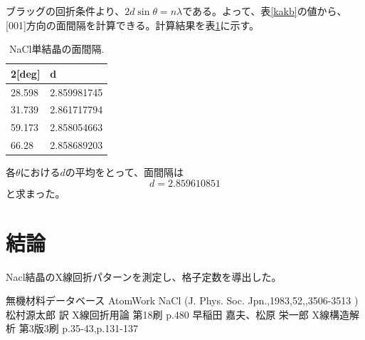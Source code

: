 \documentclass[11pt,a4j,uplatex]{jsarticle}
\begin{document}
\newpage

 ブラッグの回折条件より、$2d\sin\theta=n\lambda$である。よって、表\ref{kakb}の値から、[001]方向の面間隔を計算できる。計算結果を表\ref{d}に示す。%

 \begin{table}[htbp]
  \begin{center}
   \caption{NaCl単結晶の面間隔.}
   \begin{tabular}{|l|l|}  \hline
    2[deg] & d           \\  \hline  \hline
    28.598 & 2.859981745 \\
    31.739 & 2.861717794 \\
    59.173 & 2.858054663 \\
    66.28  & 2.858689203 \\ \hline
   \end{tabular}
   \label{d}
  \end{center}
 \end{table}

 各$\theta$における$d$の平均をとって、面間隔は
 \begin{equation}
  d=2.859610851
  \label{fin}
 \end{equation}
 と求まった。
\fi

\section{結論}
Nacl結晶のX線回折パターンを測定し、格子定数を導出した。

\begin{thebibliography}{9}
 無機材料データベース AtomWork  NaCl (J. Phys. Soc. Jpn.,1983,52,,3506-3513 )
  松村源太郎 訳 X線回折用論 第18刷 p.480
  早稲田 嘉夫、松原 栄一郎 X線構造解析 第3版3刷 p.35-43,p.131-137


\end{thebibliography}
\end{document}
